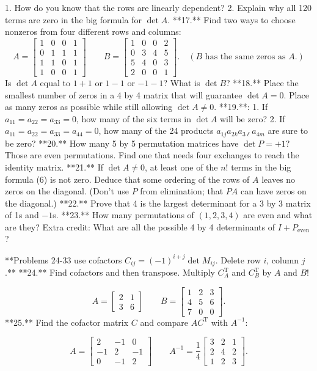 1. How do you know that the rows are linearly dependent? 2. Explain why all 120 terms are zero in the big formula for \(\det A\).
**17.** Find two ways to choose nonzeros from four different rows and columns: \[A=\begin{bmatrix}1&0&0&1\\ 0&1&1&1\\ 1&1&0&1\\ 1&0&0&1\end{bmatrix}\qquad B=\begin{bmatrix}1&0&0&2\\ 0&3&4&5\\ 5&4&0&3\\ 2&0&0&1\end{bmatrix}.\quad(B\text{ has the same zeros as }A.)\] Is \(\det A\) equal to \(1+1\) or \(1-1\) or \(-1-1\)? What is \(\det B\)?
**18.** Place the smallest number of zeros in a 4 by 4 matrix that will guarantee \(\det A=0\). Place as many zeros as possible while still allowing \(\det A\neq 0\).
**19.**: 1. If \(a_{11}=a_{22}=a_{33}=0\), how many of the six terms in \(\det A\) will be zero? 2. If \(a_{11}=a_{22}=a_{33}=a_{44}=0\), how many of the 24 products \(a_{1j}a_{2k}a_{3\ell}a_{4m}\) are sure to be zero?
**20.** How many 5 by 5 permutation matrices have \(\det P=+1\)? Those are even permutations. Find one that needs four exchanges to reach the identity matrix.
**21.** If \(\det A\neq 0\), at least one of the \(n!\) terms in the big formula (6) is not zero. Deduce that some ordering of the rows of \(A\) leaves no zeros on the diagonal. (Don't use \(P\) from elimination; that \(PA\) can have zeros on the diagonal.)
**22.** Prove that 4 is the largest determinant for a 3 by 3 matrix of 1s and \(-1\)s.
**23.** How many permutations of \((1,2,3,4)\) are even and what are they? Extra credit: What are all the possible 4 by 4 determinants of \(I+P_{\text{even}}\)?

**Problems 24-33 use cofactors \(C_{ij}=(-1)^{i+j}\det M_{ij}\). Delete row \(i\), column \(j\).**
**24.** Find cofactors and then transpose. Multiply \(C_{A}^{\text{T}}\) and \(C_{B}^{\text{T}}\) by \(A\) and \(B\)!

\[A=\begin{bmatrix}2&1\\ 3&6\end{bmatrix}\qquad B=\begin{bmatrix}1&2&3\\ 4&5&6\\ 7&0&0\end{bmatrix}.\]
**25.** Find the cofactor matrix \(C\) and compare \(AC^{\text{T}}\) with \(A^{-1}\):

\[A=\begin{bmatrix}2&-1&0\\ -1&2&-1\\ 0&-1&2\end{bmatrix}\qquad A^{-1}=\frac{1}{4}\begin{bmatrix}3&2&1\\ 2&4&2\\ 1&2&3\end{bmatrix}.\] 